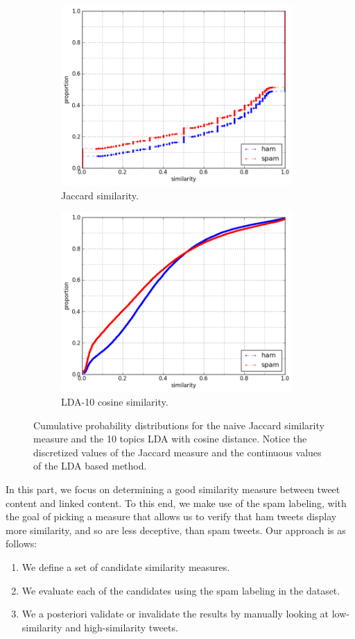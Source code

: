 \documentclass[times, 11pt, twocolumn]{article}
\begin{document}
\begin{figure}[ht]\centering
	\begin{subfigure}[c]{8.8cm}
	\includegraphics[width=8.8cm]{jacc_max.png}
	\caption{Jaccard similarity.}
	\end{subfigure}
	\begin{subfigure}[c]{8.8cm}
	\includegraphics[width=8.8cm]{cosine_lda10_max.png}
	\caption{LDA-10 cosine similarity.}
	\end{subfigure}
	\caption{Cumulative probability distributions for the
		naive Jaccard similarity measure and the 10 topics LDA
		with cosine distance. Notice the discretized values of the
		Jaccard measure and the continuous values of the LDA
	based method.}
\end{figure}

In this part, we focus on determining a good similarity measure between tweet content and linked content.
To this end, we make use of the spam labeling, with the goal of picking a measure that allows us to 
verify that ham tweets display more similarity, and so are less deceptive, than spam tweets.
Our approach is as follows:
\begin{enumerate}
	\item We define a set of candidate similarity measures.
	\item We evaluate each of the candidates using the spam labeling in the dataset.
	\item We a posteriori validate or invalidate the results by manually looking at low-similarity and high-similarity tweets.
\end{enumerate}
\end{document}

